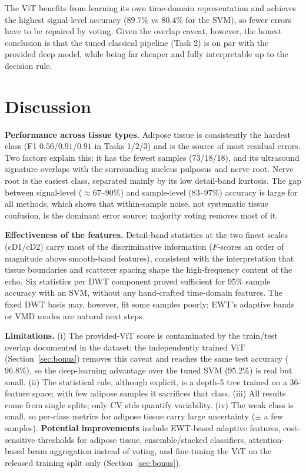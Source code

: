 \documentclass[11pt]{article}
\begin{document}
The ViT benefits from learning its own time-domain representation and achieves
the highest signal-level accuracy ($89.7\%$ vs $80.4\%$ for the SVM), so fewer
errors have to be repaired by voting. Given the overlap caveat, however, the
honest conclusion is that the tuned classical pipeline (Task 2) is on par with
the provided deep model, while being far cheaper and fully interpretable up to
the decision rule.

\section{Discussion}

\textbf{Performance across tissue types.} Adipose tissue is consistently the
hardest class (F1 $0.56$/$0.91$/$0.91$ in Tasks 1/2/3) and is the source of
most residual errors. Two factors explain this: it has the fewest samples
(73/18/18), and its ultrasound signature overlaps with the surrounding
nucleus pulposus and nerve root. Nerve root is the easiest class, separated
mainly by its low detail-band kurtosis. The gap between signal-level
($\approx 67$--$90\%$) and sample-level ($83$--$97\%$) accuracy is large for
all methods, which shows that within-sample noise, not systematic tissue
confusion, is the dominant error source; majority voting removes most of it.

\textbf{Effectiveness of the features.} Detail-band statistics at the two
finest scales (cD1/cD2) carry most of the discriminative information
($F$-scores an order of magnitude above smooth-band features), consistent with
the interpretation that tissue boundaries and scatterer spacing shape the
high-frequency content of the echo. Six statistics per DWT component proved
sufficient for $95\%$ sample accuracy with an SVM, without any hand-crafted
time-domain features. The fixed DWT basis may, however, fit some samples
poorly; EWT's adaptive bands or VMD modes are natural next steps.

\textbf{Limitations.} (i) The provided-ViT score is contaminated by the
train/test overlap documented in the dataset; the independently trained ViT
(Section~\ref{sec:bonus}) removes this caveat and reaches the same test
accuracy ($96.8\%$), so the deep-learning advantage over the tuned SVM
($95.2\%$) is real but small. (ii) The
statistical rule, although explicit, is a depth-5 tree trained on a 36-feature
space; with few adipose samples it sacrifices that class. (iii) All results
come from single splits; only CV stds quantify variability. (iv) The weak
class is small, so per-class metrics for adipose tissue carry large
uncertainty ($\pm$ a few samples). \textbf{Potential improvements} include
EWT-based adaptive features, cost-sensitive thresholds for adipose tissue,
ensemble/stacked classifiers, attention-based beam aggregation instead of
voting, and fine-tuning the ViT on the released training split only
(Section~\ref{sec:bonus}).
\end{document}
